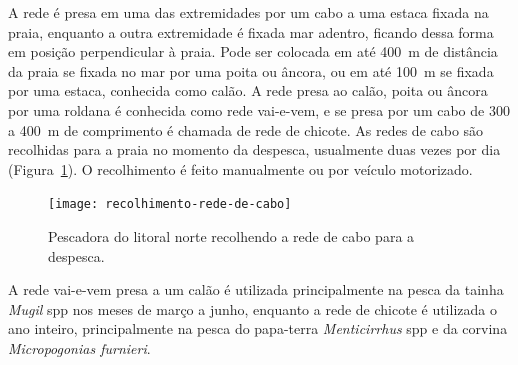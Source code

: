 \documentclass[a4paper,11pt,twoside,showtrims,onecolumn,openright,final]{memoir}
\begin{document}

A rede é presa em uma das extremidades por um cabo a uma estaca fixada na praia, enquanto 
a outra extremidade é fixada mar adentro, ficando dessa forma em posição 
perpendicular à praia. Pode ser colocada em até 400~m de distância da praia se fixada no 
mar por uma poita ou âncora, ou em até 100~m se fixada por uma estaca, 
conhecida como calão. A rede presa ao calão, poita ou âncora por uma roldana 
é conhecida como rede vai-e-vem, e se presa por um cabo de 300 a 400~m 
de comprimento é chamada de rede de chicote. As redes de cabo são recolhidas para a praia 
no momento da despesca, usualmente duas vezes por dia (Figura~\ref{foto:recolhimento-rede-de-cabo}).
O recolhimento é feito manualmente ou por veículo motorizado. %


\begin{figure}
\begin{center}
\texttt{[image: recolhimento-rede-de-cabo]}
\end{center}
\caption{Pescadora do litoral norte recolhendo a rede de cabo para a despesca.}
\label{foto:recolhimento-rede-de-cabo}
\end{figure}





A rede vai-e-vem presa a um calão é utilizada principalmente na pesca 
da tainha \emph{Mugil} spp nos meses de março a junho, enquanto a rede de chicote 
é utilizada o ano inteiro, principalmente na pesca do papa-terra \emph{Menticirrhus} spp
e da corvina \emph{Micropogonias furnieri}. 
\end{document}
